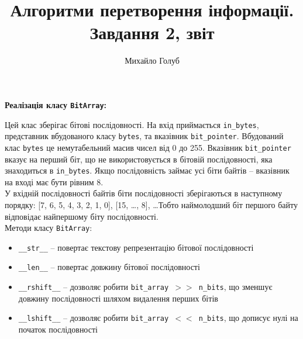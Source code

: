 \documentclass{article}
\title{Алгоритми перетворення інформації. Завдання 2, звіт}
\author{Михайло Голуб}
\def\code#1{\texttt{#1}}
\begin{document}
\maketitle
\newpage

\textbf{Реалізація класу \code{BitArray}:}\\\indent

Цей клас зберігає бітові послідовності. 
На вхід приймається \code{in\_bytes}, представник вбудованого класу \code{bytes}, та вказівник \code{bit\_pointer}. 
Вбудований клас \code{bytes} це немутабельний масив чисел від 0 до 255. 
Вказівник \code{bit\_pointer} вказує на перший біт, що не використовується в бітовій послідовності, яка знаходиться в \code{in\_bytes}. 
Якщо послідовність займає усі біти байтів -- вказівник на вході має бути рівним 8.\\\indent
У вхідній послідовності байтів біти послідовності зберігаються в наступному порядку: [7, 6, 5, 4, 3, 2, 1, 0], [15, \dots, 8], \dots Тобто наймолодший біт першого байту відповідає найпершому біту послідовності. \\\indent
Методи класу \code{BitArray}:
\begin{itemize}
    \item \code{\_\_str\_\_} -- повертає текстову репрезентацію бітової послідовності
    \item \code{\_\_len\_\_} -- повертає довжину бітової послідовності
    \item \code{\_\_rshift\_\_} -- дозволяє робити \code{bit\_array $>>$  n\_bits}, що зменшує довжину послідовності шляхом видалення перших бітів
    \item \code{\_\_lshift\_\_} -- дозволяє робити \code{bit\_array $<<$ n\_bits}, що дописує нулі на початок послідовності\\\indent
\end{itemize}
\end{document}
